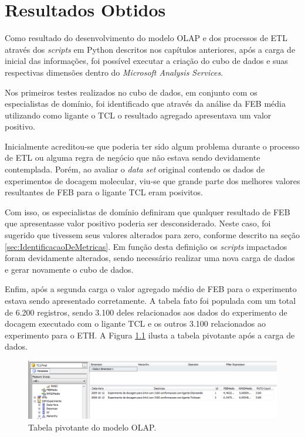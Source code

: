 \chapter{Resultados Obtidos}
\label{cap:ResultadosObtidos}

Como resultado do desenvolvimento do modelo OLAP e dos processos de ETL através dos \emph{scripts} em Python descritos nos capítulos anteriores, após a carga de inicial das informações, foi possível executar a criação do cubo de dados e suas respectivas dimensões dentro do \emph{Microsoft Analysis Services}. 

Nos primeiros testes realizados no cubo de dados, em conjunto com os especialistas de domínio, foi identificado que através da análise da FEB média utilizando como ligante o TCL o resultado agregado apresentava um valor positivo. 

Inicialmente acreditou-se que poderia ter sido algum problema durante o processo de ETL ou alguma regra de negócio que não estava sendo devidamente contemplada. Porém, ao avaliar o \emph{data set} original contendo os dados de experimentos de docagem molecular, viu-se que grande parte dos melhores valores resultantes de FEB para o ligante TCL eram posivitos.

Com isso, os especialistas de domínio definiram que qualquer resultado de FEB que apresentasse valor positivo poderia ser desconsiderado. Neste caso, foi sugerido que tivessem seus valores alterados para zero, conforme descrito na seção \ref{sec:IdentificacaoDeMetricas}. Em função desta definição os \emph{scripts} impactados foram devidamente alterados, sendo necessário realizar uma nova carga de dados e gerar novamente o cubo de dados. 

Enfim, após a segunda carga o valor agregado médio de FEB para o experimento estava sendo apresentado corretamente. A tabela fato foi populada com um total de 6.200 registros, sendo 3.100 deles relacionados aos dados do experimento de docagem executado com o ligante TCL e os outros 3.100 relacionados ao experimento para o ETH. A Figura \ref{fig:TabPivotante} ilusta a tabela pivotante após a carga de dados.

\begin{figure}[h]
        \center
        \includegraphics[scale=0.6]{images/TabelaPivotante.PNG}
        \caption{Tabela pivotante do modelo OLAP.}
        \label{fig:TabPivotante}
\end{figure}

